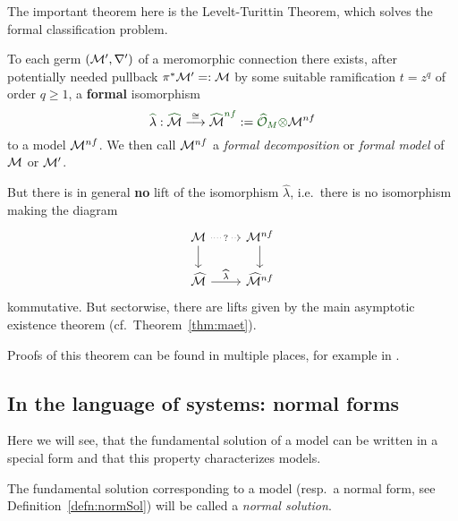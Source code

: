 The important theorem here is the Levelt-Turittin Theorem, which solves the
formal classification problem.
\begin{thm}\label{thm:leveltTurittin}
  To each germ $(\mathcal{M}',\nabla')$ of a meromorphic connection there exists, after
  potentially needed pullback $\pi^{*}\textcolor{black}{\mathcal{M}'}=:\mathcal{M}$ by some
  suitable ramification $t=z^q$ of order $q\geq1$, a
  \textcolor{green!30!black}{\textbf{formal}} isomorphism
  \[
    \textcolor{green!30!black}{\hat{\textcolor{black}{\lambda}}}:
    \textcolor{green!30!black}{\hat{\textcolor{black}{\cM}}}
    \overset{\cong}\longrightarrow
    \textcolor{green!30!black}{\hat{\textcolor{black}{\cM}}^{nf}}
    :=\textcolor{green!30!black}{\hat\cO_M\otimes}\cM^{nf}
  \]
  to a model $\mathcal{M}^{nf}$.
  We then call $\mathcal{M}^{nf}$ a \emph{formal decomposition} or \emph{formal model}
  of $\mathcal{M}$ or $\mathcal{M}'$.
  \begin{s-rem}\label{rem:leveltTurittin}
    But there is in general \textbf{no} lift of the isomorphism $\hat\lambda$,
    i.e.\ there is no isomorphism making the diagram
    \[ \begin{tikzcd}
        \cM \dar \arrow[dotted]{r}[description]{?} & \cM^{nf} \dar
        \\\hat\cM \rar{\hat\lambda} & \hat\cM^{nf}
    \end{tikzcd} \]
    kommutative.
    But sectorwise, there are lifts given by the main asymptotic existence
    theorem (cf.\ Theorem~\ref{thm:maet}).
  \end{s-rem}
\end{thm}
Proofs of this theorem can be found in multiple places, for example in
\cite[Thm.5.4.7]{sabbah_cimpa90}.


\subsection{In the language of systems: normal forms}\label{sec:normalForms}
Here we will see, that the fundamental solution of a model can be written in a
special form and that this property characterizes models.
\begin{defn}
  The fundamental solution corresponding to a model (resp.\ a normal form, see
  Definition~\ref{defn:normSol}) will be called a
  \emph{normal solution}.
\end{defn}

